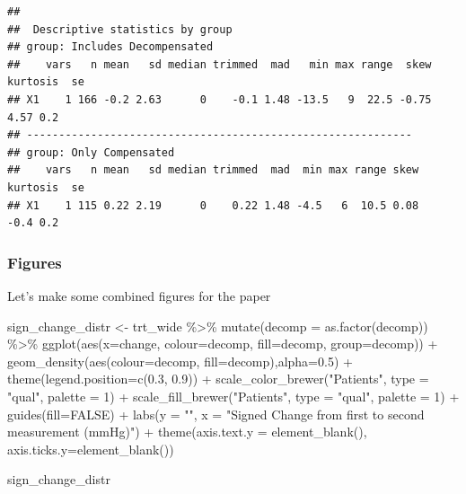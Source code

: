 \documentclass[
]{article}
\newenvironment{Shaded}{\begin{snugshade}}{\end{snugshade}}
\newcommand{\AttributeTok}[1]{\textcolor[rgb]{0.77,0.63,0.00}{#1}}
\newcommand{\ConstantTok}[1]{\textcolor[rgb]{0.00,0.00,0.00}{#1}}
\newcommand{\DecValTok}[1]{\textcolor[rgb]{0.00,0.00,0.81}{#1}}
\newcommand{\FloatTok}[1]{\textcolor[rgb]{0.00,0.00,0.81}{#1}}
\newcommand{\FunctionTok}[1]{\textcolor[rgb]{0.00,0.00,0.00}{#1}}
\newcommand{\NormalTok}[1]{#1}
\newcommand{\OtherTok}[1]{\textcolor[rgb]{0.56,0.35,0.01}{#1}}
\newcommand{\SpecialCharTok}[1]{\textcolor[rgb]{0.00,0.00,0.00}{#1}}
\newcommand{\StringTok}[1]{\textcolor[rgb]{0.31,0.60,0.02}{#1}}
\begin{document}
\begin{verbatim}
## 
##  Descriptive statistics by group 
## group: Includes Decompensated
##    vars   n mean   sd median trimmed  mad   min max range  skew kurtosis  se
## X1    1 166 -0.2 2.63      0    -0.1 1.48 -13.5   9  22.5 -0.75     4.57 0.2
## ------------------------------------------------------------ 
## group: Only Compensated
##    vars   n mean   sd median trimmed  mad  min max range skew kurtosis  se
## X1    1 115 0.22 2.19      0    0.22 1.48 -4.5   6  10.5 0.08     -0.4 0.2
\end{verbatim}

\hypertarget{figures}{%
\subsubsection{Figures}\label{figures}}

Let's make some combined figures for the paper

\begin{Shaded}
\begin{Highlighting}[]
\NormalTok{sign\_change\_distr }\OtherTok{\textless{}{-}}\NormalTok{ trt\_wide }\SpecialCharTok{\%\textgreater{}\%} 
  \FunctionTok{mutate}\NormalTok{(}\AttributeTok{decomp =} \FunctionTok{as.factor}\NormalTok{(decomp)) }\SpecialCharTok{\%\textgreater{}\%} 
  \FunctionTok{ggplot}\NormalTok{(}\FunctionTok{aes}\NormalTok{(}\AttributeTok{x=}\NormalTok{change, }\AttributeTok{colour=}\NormalTok{decomp, }\AttributeTok{fill=}\NormalTok{decomp, }\AttributeTok{group=}\NormalTok{decomp)) }\SpecialCharTok{+}
  \FunctionTok{geom\_density}\NormalTok{(}\FunctionTok{aes}\NormalTok{(}\AttributeTok{colour=}\NormalTok{decomp, }\AttributeTok{fill=}\NormalTok{decomp),}\AttributeTok{alpha=}\FloatTok{0.5}\NormalTok{) }\SpecialCharTok{+}
  \FunctionTok{theme}\NormalTok{(}\AttributeTok{legend.position=}\FunctionTok{c}\NormalTok{(}\FloatTok{0.3}\NormalTok{, }\FloatTok{0.9}\NormalTok{)) }\SpecialCharTok{+}
  \FunctionTok{scale\_color\_brewer}\NormalTok{(}\StringTok{"Patients"}\NormalTok{, }\AttributeTok{type =} \StringTok{"qual"}\NormalTok{, }\AttributeTok{palette =} \DecValTok{1}\NormalTok{) }\SpecialCharTok{+}
  \FunctionTok{scale\_fill\_brewer}\NormalTok{(}\StringTok{"Patients"}\NormalTok{, }\AttributeTok{type =} \StringTok{"qual"}\NormalTok{, }\AttributeTok{palette =} \DecValTok{1}\NormalTok{) }\SpecialCharTok{+}
  \FunctionTok{guides}\NormalTok{(}\AttributeTok{fill=}\ConstantTok{FALSE}\NormalTok{) }\SpecialCharTok{+}
  \FunctionTok{labs}\NormalTok{(}\AttributeTok{y =} \StringTok{""}\NormalTok{,}
       \AttributeTok{x =} \StringTok{"Signed Change from first to second measurement (mmHg)"}\NormalTok{) }\SpecialCharTok{+}
  \FunctionTok{theme}\NormalTok{(}\AttributeTok{axis.text.y =} \FunctionTok{element\_blank}\NormalTok{(),}
        \AttributeTok{axis.ticks.y=}\FunctionTok{element\_blank}\NormalTok{())}

\NormalTok{sign\_change\_distr}
\end{Highlighting}
\end{Shaded}
\end{document}
